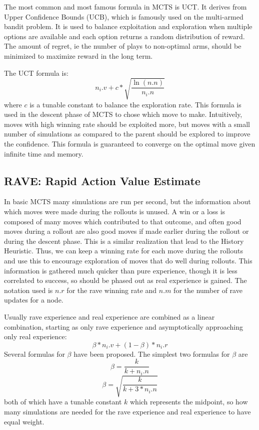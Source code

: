 The most common and most famous formula in MCTS is UCT. It derives from Upper Confidence Bounds (UCB), which is famously used on the multi-armed bandit problem. It is used to balance exploitation and exploration when multiple options are available and each option returns a random distribution of reward. The amount of regret, ie the number of plays to non-optimal arms, should be minimized to maximize reward in the long term.

The UCT formula is: $$n_i.v + c*\sqrt{\frac{\ln(n.n)}{n_i.n}}$$ where $c$ is a tunable constant to balance the exploration rate. This formula is used in the descent phase of MCTS to chose which move to make. Intuitively, moves with high winning rate should be exploited more, but moves with a small number of simulations as compared to the parent should be explored to improve the confidence. This formula is guaranteed to converge on the optimal move given infinite time and memory.




\subsection{RAVE: Rapid Action Value Estimate}

In basic MCTS many simulations are run per second, but the information about which moves were made during the rollouts is unused. A win or a loss is composed of many moves which contributed to that outcome, and often good moves during a rollout are also good moves if made earlier during the rollout or during the descent phase. This is a similar realization that lead to the History Heuristic. Thus, we can keep a winning rate for each move during the rollouts and use this to encourage exploration of moves that do well during rollouts. This information is gathered much quicker than pure experience, though it is less correlated to success, so should be phased out as real experience is gained. The notation used is $n.r$ for the rave winning rate and $n.m$ for the number of rave updates for a node.

Usually rave experience and real experience are combined as a linear combination, starting as only rave experience and asymptotically approaching only real experience:
$$ \beta*n_i.v + (1-\beta)*n_i.r $$
Several formulas for $\beta$ have been proposed. The simplest two formulas for $\beta$ are $$\beta = \frac{k}{k+n_i.n}$$ $$\beta = \sqrt{\frac{k}{k+3*n_i.n}}$$ both of which have a tunable constant $k$ which represents the midpoint, so how many simulations are needed for the rave experience and real experience to have equal weight.

